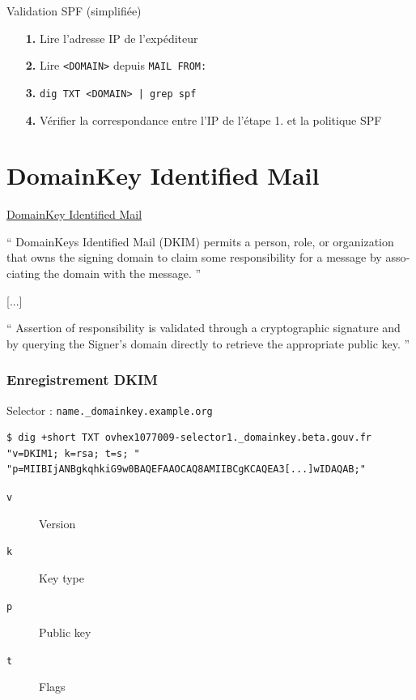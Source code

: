 \documentclass{beamer}
\begin{document}
\begin{frame}{Validation SPF (simplifiée)}
    \begin{itemize}
        \item[\textbf{1.}] Lire l'adresse IP de l'expéditeur
        \item[\textbf{2.}] Lire \texttt{<DOMAIN>} depuis \texttt{MAIL FROM:}
        \item[\textbf{3.}] \texttt{dig TXT <DOMAIN> | grep spf}
        \item[\textbf{4.}] Vérifier la correspondance entre l'IP de l'étape 1. et la politique SPF
    \end{itemize}
\end{frame}

\section{DomainKey Identified Mail}

\begin{frame}{\href{https://datatracker.ietf.org/doc/html/rfc6376}{DomainKey Identified Mail}}

    \foreignquote{english}{
        DomainKeys Identified Mail (DKIM) permits a person, role, or
        organization that owns the signing domain to claim some
        responsibility for a message by associating the domain with the
        message.
    }

    \vspace{0.2cm}
    [...]
    \vspace{0.2cm}

    \foreignquote{english}{
        Assertion of responsibility is validated through a cryptographic
        signature and by querying the Signer's domain directly to retrieve the
        appropriate public key.
    }
\end{frame}

\begin{frame}[fragile]
    \frametitle{Enregistrement DKIM}

    Selector : \texttt{name.\_domainkey.example.org}

    \begin{verbatim}
$ dig +short TXT ovhex1077009-selector1._domainkey.beta.gouv.fr
"v=DKIM1; k=rsa; t=s; "
"p=MIIBIjANBgkqhkiG9w0BAQEFAAOCAQ8AMIIBCgKCAQEA3[...]wIDAQAB;"
    \end{verbatim}

    \begin{description}
        \item[\texttt{v}] Version
        \item[\texttt{k}] Key type
        \item[\texttt{p}] Public key
        \item[\texttt{t}] Flags
    \end{description}
\end{frame}
\end{document}
